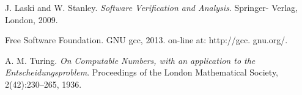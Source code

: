\documentclass[a4paper]{article}
\begin{document}

\begin{thebibliography}{9}

 J. Laski and W. Stanley. \emph{Software Verification and Analysis}. Springer- Verlag, London, 2009.

 Free Software Foundation. GNU gcc, 2013. on-line at: http://gcc. gnu.org/.

 A. M. Turing. \emph{On Computable Numbers, with an application to the Entscheidungsproblem}. Proceedings of the London Mathematical Society, 2(42):230–265, 1936.


\end{thebibliography}
\end{document}
